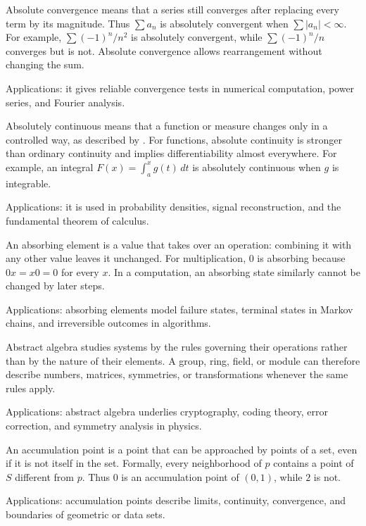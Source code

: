 Absolute convergence means that a series still converges after replacing every term by its magnitude. Thus $\sum a_n$ is absolutely convergent when $\sum|a_n|<\infty$. For example, $\sum(-1)^n/n^2$ is absolutely convergent, while $\sum(-1)^n/n$ converges but is not. Absolute convergence allows rearrangement without changing the sum. \par\noindent Applications: it gives reliable convergence tests in numerical computation, power series, and Fourier analysis.

Absolutely continuous means that a function or measure changes only in a controlled way, as described by . For functions, absolute continuity is stronger than ordinary continuity and implies differentiability almost everywhere. For example, an integral $F(x)=\int_a^x g(t)\,dt$ is absolutely continuous when $g$ is integrable. \par\noindent Applications: it is used in probability densities, signal reconstruction, and the fundamental theorem of calculus.

An absorbing element is a value that takes over an operation: combining it with any other value leaves it unchanged. For multiplication, $0$ is absorbing because $0x=x0=0$ for every $x$. In a computation, an absorbing state similarly cannot be changed by later steps. \par\noindent Applications: absorbing elements model failure states, terminal states in Markov chains, and irreversible outcomes in algorithms.

Abstract algebra studies systems by the rules governing their operations rather than by the nature of their elements. A group, ring, field, or module can therefore describe numbers, matrices, symmetries, or transformations whenever the same rules apply. \par\noindent Applications: abstract algebra underlies cryptography, coding theory, error correction, and symmetry analysis in physics.

An accumulation point is a point that can be approached by points of a set, even if it is not itself in the set. Formally, every neighborhood of $p$ contains a point of $S$ different from $p$. Thus $0$ is an accumulation point of $(0,1)$, while $2$ is not. \par\noindent Applications: accumulation points describe limits, continuity, convergence, and boundaries of geometric or data sets.

